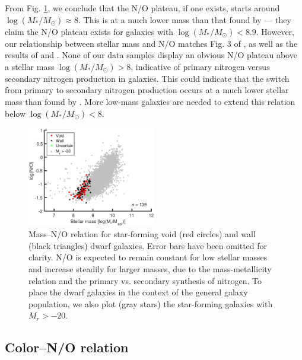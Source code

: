 From Fig. \ref{fig:MNO}, we conclude that the N/O plateau, if one exists, starts 
around $\log(M_*/M_{\odot}) \approx 8$.  This is at a much lower mass than that 
found by \cite{Andrews13} --- they claim the N/O plateau exists for galaxies 
with $\log(M_*/M_{\odot}) < 8.9$.  However, our relationship between stellar 
mass and N/O matches Fig. 3 of \cite{Amorin10}, as well as the results of 
\cite{PerezMontero09} and \cite{PerezMontero13}.  None of our data samples 
display an obvious N/O plateau above a stellar mass 
$\log(M_*/M_{\odot}) > 8$, indicative of primary nitrogen versus secondary 
nitrogen production in galaxies.  This could indicate that the switch from 
primary to secondary nitrogen production occurs at a much lower stellar mass 
than found by \cite{Andrews13}.  More low-mass galaxies are needed to extend 
this relation below $\log(M_*/M_{\odot}) < 8$.

\begin{figure}
    \includegraphics[width=0.5\textwidth]{Images/Paper2/MNO_1sig_I06_dwarf_0-20_SF_t3}
    \caption[Stellar mass versus N/O for 135 dwarf galaxy sample]{Mass--N/O 
    relation for star-forming void (red circles) and wall (black triangles) 
    dwarf galaxies.  Error bars have been omitted for clarity.  N/O is expected 
    to remain constant for low stellar masses and increase steadily for larger 
    masses, due to the mass-metallicity relation and the primary vs. secondary 
    synthesis of nitrogen.  To place the dwarf galaxies in the context of the 
    general galaxy population, we also plot (gray stars) the star-forming 
    galaxies with $M_r > -20$.}
    \label{fig:MNO}
\end{figure}


\subsection{Color--N/O relation}

